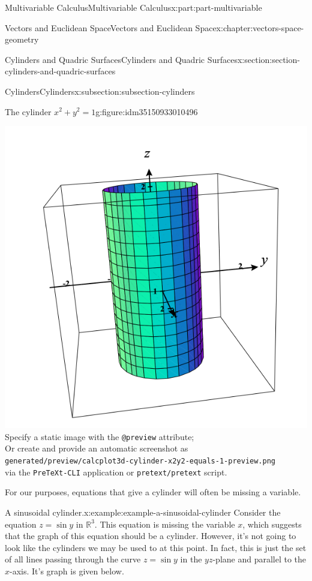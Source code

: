 \documentclass[twoside,10pt,]{tufte-book}
\newcommand{\mono}[1]{\texttt{#1}}
\numberwithin{equation}{part}
\newlength{\qrsize}
\newlength{\previewwidth}
\newcommand{\RR}{\mathbb{R}}
\begin{document}
\begin{partptx}{Multivariable Calculus}{}{Multivariable Calculus}{}{}{x:part:part-multivariable}
\begin{chapterptx}{Vectors and Euclidean Space}{}{Vectors and Euclidean Space}{}{}{x:chapter:vectors-space-geometry}
\begin{sectionptx}{Cylinders and Quadric Surfaces}{}{Cylinders and Quadric Surfaces}{}{}{x:section:section-cylinders-and-quadric-surfaces}
\begin{subsectionptx}{Cylinders}{}{Cylinders}{}{}{x:subsection:subsection-cylinders}
\begin{figureptx}{The cylinder \(x^2+y^2=1\)}{g:figure:idm35150933010496}{}
\begin{tcbraster}[raster columns=2, raster column skip=1pt, raster halign=center, raster force size=false, raster left skip=0pt, raster right skip=0pt]
\begin{tcolorbox}[previewstyle, width=\previewwidth]
{\includegraphics[width=0.80\linewidth,height=\qrsize,keepaspectratio]{generated/preview/calcplot3d-cylinder-x2y2-equals-1-preview.png}}%
{\small{}Specify a static image with the \mono{@preview} attribute;\\%
Or create and provide an automatic screenshot as\\%
\mono{generated/preview/calcplot3d-cylinder-x2y2-equals-1-preview.png}\\%
via the \mono{PreTeXt-CLI} application or \mono{pretext/pretext} script.}%
\end{tcolorbox}%
\begin{tcolorbox}[qrstyle]%
{\hypersetup{urlcolor=black}}%
\end{tcolorbox}%
\end{tcbraster}%
\tcblower
\end{figureptx}%
For our purposes, equations that give a cylinder will often be missing a variable.%
\begin{example}{A sinusoidal cylinder.}{x:example:example-a-sinusoidal-cylinder}%
Consider the equation \(z = \sin y\) in \(\RR^{3}\). This equation is missing the variable \(x\), which suggests that the graph of this equation should be a cylinder. However, it's not going to look like the cylinders we may be used to at this point. In fact, this is just the set of all lines passing through the curve \(z=\sin y\) in the \(yz\)-plane and parallel to the \(x\)-axis. It's graph is given below.%

\end{example}
\end{subsectionptx}
\end{sectionptx}
\end{chapterptx}
\end{partptx}
\end{document}
